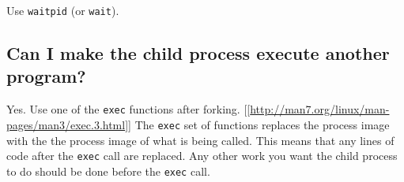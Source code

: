 Use \texttt{waitpid} (or \texttt{wait}).

\begin{Shaded}
\begin{Highlighting}[]
 
 \NormalTok{) \{ }
   
   \NormalTok{);}
\NormalTok{\} } \NormalTok{\{ }
  \NormalTok{);}
\NormalTok{\}}
\end{Highlighting}
\end{Shaded}

\subsection{Can I make the child process execute another
program?}\label{can-i-make-the-child-process-execute-another-program}

Yes. Use one of the \texttt{exec} functions after forking.
{[}{[}\url{http://man7.org/linux/man-pages/man3/exec.3.html}{]}{]} The
\texttt{exec} set of functions replaces the process image with the the
process image of what is being called. This means that any lines of code
after the \texttt{exec} call are replaced. Any other work you want the
child process to do should be done before the \texttt{exec} call.

